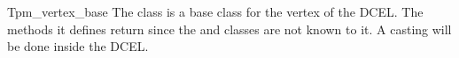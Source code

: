
\ccRefPageBegin



\begin{ccRefClass}{Tpm_vertex_base}
\label{DCEL_sec:vertex_base}
\ccDefinition The class  is a
base class for the vertex of the DCEL.
The methods it defines 
return  since the  and  classes 
are not known to it. A casting will be done inside the DCEL. 




\ccAccessFunctions
{}
\ccGlue
{}

\ccModifiers
{}

\end{ccRefClass}


